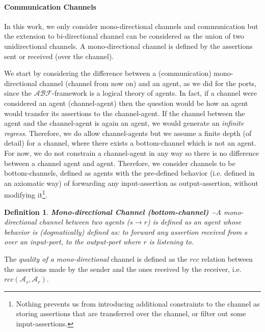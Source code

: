 \documentclass[conference]{IEEEtran}
\newcommand{\assertionRegion}{\mathcal{A}}
\newcommand{\beliefRegion}{\mathcal{B}}
\newcommand{\factRegion}{\mathcal{F}}
\newcommand{\rcc}{rcc}
\newcommand{\abftheory}{\assertionRegion\beliefRegion\factRegion}
\newcommand{\Rcc}[2]{rcc(#1,#2)}
\newtheorem{definition}{Definition}%
\begin{document}
\paragraph{Communication Channels}
In this work, we only consider
mono-directional channels and communication but the extension to bi-directional
channel can be considered as the union of two unidirectional channels. A
mono-directional channel is defined by the assertions sent or received (over
the channel). 

We start by considering the difference between a (communication)
mono-directional channel (channel from now on) and an agent, as we did for the
ports, since the $\abftheory$-framework is a logical theory of agents.  In fact, if a channel
were considered an agent (channel-agent) then the question would be how an
agent would transfer its assertions to the channel-agent. If the channel
between the agent and the channel-agent is again an agent, we would generate an
\emph{infinite regress}. Therefore, we do allow channel-agents but we assume a
finite depth (of detail) for a channel, where there exists a bottom-channel
which is not an agent. For now, we do not constrain a channel-agent in any way
so there is no difference between a channel agent and agent. Therefore,
we consider channels to be bottom-channels,
defined as agents with the pre-defined behavior (i.e. defined in an axiomatic
way) of forwarding any input-assertion as output-assertion, without modifying it\footnote{Nothing
prevents us from introducing additional constraints to the channel as storing
assertions that are transferred over the channel, or filter out some
input-assertions.}. 

\begin{definition}{\bf Mono-directional Channel (bottom-channel) --}\label{def:monochannel}
	A mono-directional channel between two agents ($s \rightarrow r$) is
	defined as an agent whose behavior is (dogmatically) defined as: to
	forward any assertion received from $s$ over an input-port, to  the
	output-port where $r$ is listening to.
\end{definition}
The \emph{quality of a mono-directional} channel is defined as the $\rcc$
relation between the assertions made by the sender and the ones received by the
receiver, i.e. $\Rcc{\assertionRegion_s}{\assertionRegion_r}$.
\end{document}
